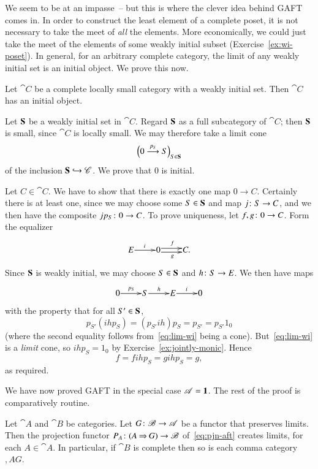 We seem to be at an impasse~-- but this is where the clever idea behind GAFT
comes in.  In order to construct the least element of a complete poset, it
is not necessary to take the meet of \emph{all} the elements.  More
economically, we could just take the meet of the elements of some weakly
initial subset (Exercise~\ref{ex:wi-poset}).  In general, for an arbitrary
complete category, the limit of any weakly initial set is an initial
object.  We prove this now.

\begin{alemma}
\label{lemma:wi-init}
Let $\cat{C}$ be a complete locally small category with a weakly initial
set.  Then $\cat{C}$ has an initial object.
\end{alemma}

\begin{pf}
Let $\mathbf{S}$ be a weakly initial set in $\cat{C}$.  Regard $\mathbf{S}$ as
a full subcategory of $\cat{C}$; then $\mathbf{S}$ is small, since $\cat{C}$
is locally small.  We may therefore take a limit cone
%
\begin{equation}
\label{eq:lim-wi}
\Bigl( 0 \stackrel{p_S}{\longrightarrow} S \Bigr)_{S \in \mathbf{S}}
\end{equation}
%
of the inclusion $\mathbf{S} \hookrightarrow \mathscr{C}$.  We prove that $0$ is initial.

Let $C \in \cat{C}$.  We have to show that there is exactly one map $0 \to
C$.  Certainly there is at least one, since we may choose some $S \in
\mathbf{S}$ and map $j \from S \to C$, and we then have the composite $j p_S
\from 0 \to C$.  To prove uniqueness, let $f, g \from 0 \to C$.  Form the
equalizer
\[
\xymatrix@1{
E \ar[r]^i      &0 \ar@<.5ex>[r]^f \ar@<-.5ex>[r]_g       &C.
}
\]
Since $\mathbf{S}$ is weakly initial, we may choose $S \in \mathbf{S}$ and
$h\from S \to E$.  We then have maps
\[
\xymatrix@1{
0 \ar[r]^{p_S} &S \ar[r]^h &E \ar[r]^i &0 \\
}
\]
with the property that for all $S' \in \mathbf{S}$,
\[
p_{S'}(ihp_S) = (p_{S'}ih)p_S = p_{S'} = p_{S'} 1_0
\]
(where the second equality follows from~\eqref{eq:lim-wi} being a cone).
But~\eqref{eq:lim-wi} is a \emph{limit} cone, so $ihp_S = 1_0$ by
Exercise~\ref{ex:jointly-monic}.  Hence
\[
f = fihp_S = gihp_S = g,
\]
as required.
\end{pf}

We have now proved GAFT in the special case $\mathscr{A} = \mathbf{1}$.  The rest of
the proof is comparatively routine.

\begin{alemma}
\label{lemma:gaft-creates}
%
%
%
%
Let $\cat{A}$ and $\cat{B}$ be categories.  Let $G \from \cat{B} \to
\cat{A}$ be a functor that preserves limits.  Then the projection functor
$P_A \from \comma{A}{G} \to \cat{B}$ of~\eqref{eq:pjn-aft} creates limits,
for each $A \in \cat{A}$.  In particular, if $\cat{B}$ is complete then so
is each comma category $\comma{A}{G}$.
\end{alemma}

